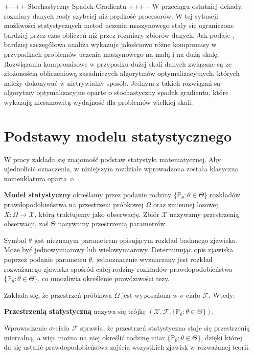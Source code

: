 ++++
Stochastyczny Spadek Gradientu
++++
W przeciągu ostatniej dekady, rozmiary danych rosły szybciej niż prędkość procesorów. W tej sytuacji możliwości statystycznych metod uczenia maszynowego stały się ograniczone bardziej przez czas obliczeń niż przez rozmiary zbiorów danych. Jak podaje \cite{bott1}, bardziej szczegółowa analiza wykazuje jakościowo różne kompromisy w przypadkach problemów uczenia maszynowego na małą i na dużą skalę. Rozwiązania kompromisowe w przypadku dużej skali danych związane są ze złożonością obliczeniową zasadniczych algorytmów optymalizacyjnych, których należy dokonywać w nietrywialny sposób. Jednym z takich rozwiązań są algorytmy optymalizacyjne oparte o stochastyczny spadek gradientu, które wykazują niesamowitą wydajność dla problemów wielkiej skali.

\chapter*{Podstawy modelu statystycznego}

W pracy zakłada się znajomość podstaw statystyki matematycznej. Aby ujednolicić oznaczenia, w niniejszym rozdziale wprowadzona została klasyczna nomenklatura oparta~o~\cite{niemiro}.

\begin{definition}
\textbf{Model statystyczny} określamy przez podanie rodziny $\{ \mathbb P_{\theta}:\theta\in\Theta\} $ rozkładów prawdopodobieństwa na przestrzeni próbkowej $\Omega$ oraz zmiennej losowej $X : \Omega \rightarrow \mathcal{X}$, którą traktujemy jako obserwację. Zbiór $\mathcal{X}$ nazywamy przestrzenią obserwacji, zaś $\Theta$ nazywamy przestrzenią parametrów. \\
\end{definition}
Symbol $\theta$ jest nieznanym parametrem opisującym rozkład badanego zjawiska. Może być jednowymiarowy lub wielowymiarowy. Determinując opis zjawiska poprzez podanie parametru $\theta$, jednoznacznie wyznaczany jest rozkład rozważanego zjawiska spośród całej rodziny rozkładów prawdopodobieństwa $\{ \mathbb P_{\theta}:\theta\in\Theta\}$, co umożliwia określenie prawdziwości tezy.
\par
Zakłada się, że przestrzeń próbkowa $\Omega$ jest wyposażona w $\sigma$-ciało $\mathcal{F}$. Wtedy:
\begin{definition}
\textbf{Przestrzenią statystyczną} nazywa się trójkę $(\mathcal{X},\mathcal{F},\{\mathbb P_{\theta}:\theta\in\Theta\})$.
\end{definition}
Wprowadzenie $\sigma$-ciała $\mathcal{F}$ sprawia, że przestrzeń statystyczna staje się przestrzenią mierzalną, a więc można na niej określić rodzinę miar $\{ \mathbb P_{\theta}:\theta\in\Theta\} $, dzięki której da się ustalić prawdopodobieństwa$  $ zajścia wszystkich zjawisk w rozważanej teorii.


